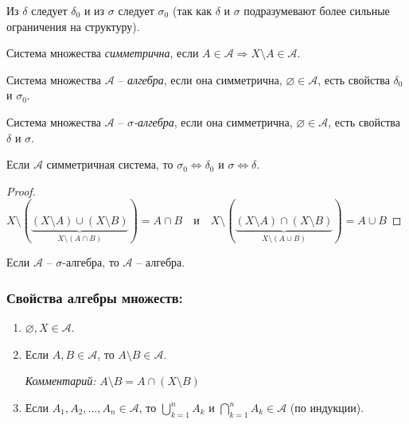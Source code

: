 \begin{remark}
    Из $\delta$ следует $\delta_0$ и из $\sigma$ следует $\sigma_0$ (так как $\delta$ и $\sigma$ подразумевают 
    более сильные ограничения на структуру).
\end{remark}

\begin{definition}
    Система множества \textit{симметрична}, если $A\in \mathcal{A}\Rightarrow X\setminus A\in \mathcal{A}$.
\end{definition}

\begin{definition}
    Система множества $\mathcal{A}$ – \textit{алгебра}, если она симметрична, $\varnothing \in \mathcal{A}$, есть свойства $\delta_0$ и $\sigma_0$.
\end{definition}

\begin{definition}
    Система множества $\mathcal{A}$ – \textit{$\sigma$-алгебра}, если она симметрична, $\varnothing \in \mathcal{A}$, есть свойства $\delta$ и $\sigma$.
\end{definition}

\begin{statement}
    Если $\mathcal{A}$ симметричная система, то $\sigma_0\Leftrightarrow \delta_0$ и $\sigma\Leftrightarrow \delta$.
\end{statement}

\begin{proof}
    $X\setminus (\underbrace{(X\setminus A)\cup (X\setminus B)}_{X\setminus (A\cap B)})= A\cap B\quad\text{и}\quad
    X\setminus (\underbrace{(X\setminus A)\cap (X\setminus B)}_{X\setminus (A\cup B)})= A\cup B$
\end{proof}

\begin{remark}
    Если $\mathcal{A}$ – $\sigma$-алгебра, то $\mathcal{A}$ – алгебра.
\end{remark}

\subsubsection*{Свойства алгебры множеств:}

\begin{enumerate}
    \item $\varnothing, X\in \mathcal{A}$.
    \item Если $A, B \in \mathcal{A}$, то $A\setminus B\in \mathcal{A}$.
    
    \textit{Комментарий:} $A\setminus B = A\cap (X \setminus B)$
    \item Если $A_1, A_2, ..., A_n\in \mathcal{A}$, то $\bigcup\limits_{k = 1}^n A_k$ и $\bigcap\limits_{k = 1}^n A_k\in \mathcal{A}$ (по индукции).
\end{enumerate}

